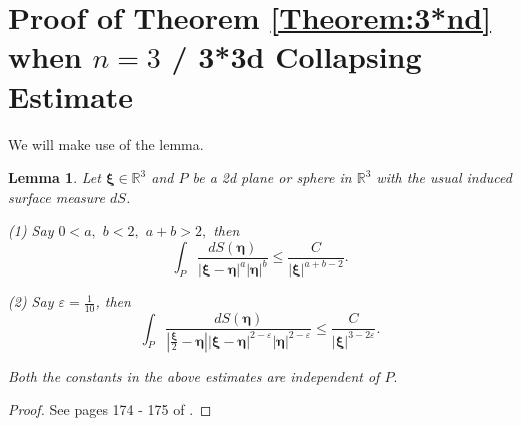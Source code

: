\documentclass[reqno]{amsart}
\theoremstyle{plain}
\newtheorem{lemma}{Lemma}
\numberwithin{equation}{section}
\begin{document}
\section{Proof of Theorem \protect\ref{Theorem:3*nd} when $n=3$ / 3*3d
Collapsing Estimate\label{Sec:ProofOf3*3d}}

We will make use of the lemma.

\begin{lemma}
\label{Lemma:MateiLemmaForIntegrals}\cite{KlainermanAndMachedon}Let $\mathbf{\xi }\in \mathbb{R}^{3}$ and $P$ be a 2d plane or sphere in $\mathbb{R}^{3}$
with the usual induced surface measure $dS$.

(1) Say $0<a,$ $b<2,$ $a+b>2,$ then\begin{equation*}
\int_{P}\frac{dS(\mathbf{\eta })}{\left\vert \mathbf{\xi }-\mathbf{\eta }\right\vert ^{a}\left\vert \mathbf{\eta }\right\vert ^{b}}\leqslant \frac{C}{\left\vert \mathbf{\xi }\right\vert ^{a+b-2}}.
\end{equation*}

(2) Say $\varepsilon =\frac{1}{10}$, then\begin{equation*}
\int_{P}\frac{dS(\mathbf{\eta })}{\left\vert \frac{\mathbf{\xi }}{2}-\mathbf{\eta }\right\vert \left\vert \mathbf{\xi }-\mathbf{\eta }\right\vert
^{2-\varepsilon }\left\vert \mathbf{\eta }\right\vert ^{2-\varepsilon }}\leqslant \frac{C}{\left\vert \mathbf{\xi }\right\vert ^{3-2\varepsilon }}.
\end{equation*}

Both the constants in the above estimates are independent of $P.$
\end{lemma}

\begin{proof}
See pages 174 - 175 of \cite{KlainermanAndMachedon}.
\end{proof}
\end{document}

